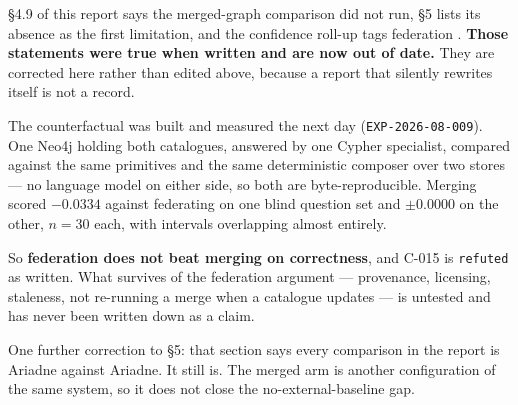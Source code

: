 \S4.9 of this report says the merged-graph comparison did not run, \S5 lists its
absence as the first limitation, and the confidence roll-up tags federation
. \textbf{Those statements were true when written and are
now out of date.} They are corrected here rather than edited above, because a
report that silently rewrites itself is not a record.

The counterfactual was built and measured the next day
(\texttt{EXP-2026-08-009}). One Neo4j holding both catalogues, answered by one
Cypher specialist, compared against the same primitives and the same
deterministic composer over two stores --- no language model on either side, so
both are byte-reproducible. Merging scored $-0.0334$ against federating on one
blind question set and $\pm0.0000$ on the other, $n = 30$ each, with intervals
overlapping almost entirely.

So \textbf{federation does not beat merging on correctness}, and C-015 is
\texttt{refuted} as written. What survives of the federation argument ---
provenance, licensing, staleness, not re-running a merge when a catalogue
updates --- is untested and has never been written down as a claim.

One further correction to \S5: that section says every comparison in the report
is Ariadne against Ariadne. It still is. The merged arm is another configuration
of the same system, so it does not close the no-external-baseline gap.
